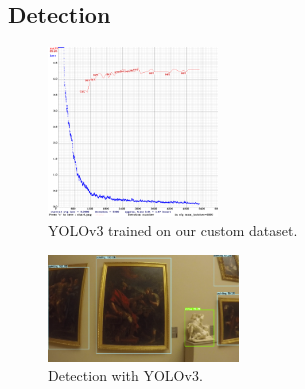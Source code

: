 \subsection{Detection}



\begin{figure}[b!]
    \centering
        \includegraphics[width=0.4\textwidth]{pictures/painting_detection/training-v3.png}
    \caption{YOLOv3 trained on our custom dataset.}
    \label{fig:training-v3}
\end{figure}

\begin{figure}[h!]
    \centering
        \includegraphics[width=0.45\textwidth]{pictures/painting_detection/yolo-detection2.PNG}
    \caption{Detection with YOLOv3.}
    \label{fig:yolo_detection}
\end{figure}


